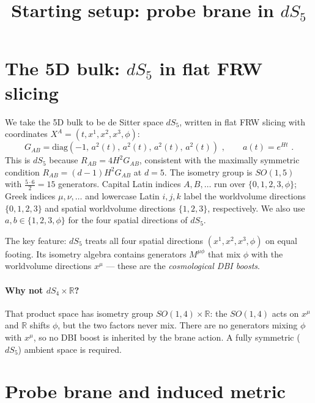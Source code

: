 \documentclass[11pt]{article}
\title{Starting setup: probe brane in $dS_5$}
\author{}
\date{}
\begin{document}
\maketitle

\section{\texorpdfstring{The 5D bulk: $dS_5$ in flat FRW slicing}{The 5D bulk: dS5 in flat FRW slicing}}

We take the 5D bulk to be de Sitter space $dS_5$, written in flat FRW slicing with coordinates
$X^A = (t, x^1, x^2, x^3, \phi)$:
\begin{equation}
\label{eq:bulk-metric}
G_{AB} = \mathrm{diag}\!\left(-1,\, a^2(t),\, a^2(t),\, a^2(t),\, a^2(t)\right) \,\,, \qquad a(t) = e^{Ht} \,\,.
\end{equation}
This is $dS_5$ because $R_{AB} = 4H^2 G_{AB}$, consistent with the maximally symmetric condition
$R_{AB} = (d-1)H^2 G_{AB}$ at $d=5$. The isometry group is $SO(1,5)$ with $\frac{5 \cdot 6}{2} = 15$ generators.
Capital Latin indices $A, B, \ldots$ run over $\{0,1,2,3,\phi\}$; Greek indices $\mu,\nu,\ldots$ and
lowercase Latin $i,j,k$ label the worldvolume directions $\{0,1,2,3\}$ and spatial worldvolume directions
$\{1,2,3\}$, respectively.  We also use $a, b \in \{1,2,3,\phi\}$ for the four spatial directions of $dS_5$.

The key feature: $dS_5$ treats all four spatial directions $(x^1, x^2, x^3, \phi)$ on equal footing.
Its isometry algebra contains generators $M^{\mu\phi}$ that mix $\phi$ with the worldvolume
directions $x^\mu$ --- these are the \emph{cosmological DBI boosts}.

\paragraph{Why not $dS_4 \times \mathbb{R}$?}
That product space has isometry group $SO(1,4)\times\mathbb{R}$: the $SO(1,4)$ acts on $x^\mu$ and
$\mathbb{R}$ shifts $\phi$, but the two factors never mix.  There are no generators mixing $\phi$ with
$x^\mu$, so no DBI boost is inherited by the brane action.  A fully symmetric ($dS_5$) ambient space
is required.

\section{Probe brane and induced metric}
\end{document}
